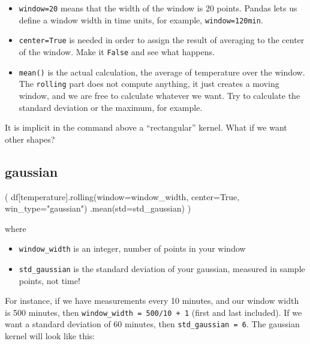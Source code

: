 \documentclass[
  letterpaper,
  DIV=11,
  numbers=noendperiod,
  oneside]{scrreprt}
\newenvironment{Shaded}{\begin{snugshade}}{\end{snugshade}}
\newcommand{\NormalTok}[1]{\textcolor[rgb]{0.00,0.23,0.31}{#1}}
\newcommand{\OperatorTok}[1]{\textcolor[rgb]{0.37,0.37,0.37}{#1}}
\newcommand{\StringTok}[1]{\textcolor[rgb]{0.13,0.47,0.30}{#1}}
\newcommand{\VariableTok}[1]{\textcolor[rgb]{0.07,0.07,0.07}{#1}}
\providecommand{\tightlist}{%
  \setlength{\itemsep}{0pt}\setlength{\parskip}{0pt}}\usepackage{longtable,booktabs,array}
\begin{document}
\begin{itemize}
\tightlist
\item
  \texttt{window=20} means that the width of the window is 20 points.
  Pandas lets us define a window width in time units, for example,
  \texttt{window=\textquotesingle{}120min\textquotesingle{}}.
\item
  \texttt{center=True} is needed in order to assign the result of
  averaging to the center of the window. Make it \texttt{False} and see
  what happens.
\item
  \texttt{mean()} is the actual calculation, the average of temperature
  over the window. The \texttt{rolling} part does not compute anything,
  it just creates a moving window, and we are free to calculate whatever
  we want. Try to calculate the standard deviation or the maximum, for
  example.
\end{itemize}

It is implicit in the command above a ``rectangular'' kernel. What if we
want other shapes?

\hypertarget{gaussian}{%
\subsection{gaussian}\label{gaussian}}

\begin{Shaded}
\begin{Highlighting}[]
\NormalTok{(}
\NormalTok{df[}\StringTok{\textquotesingle{}temperature\textquotesingle{}}\NormalTok{].rolling(window}\OperatorTok{=}\NormalTok{window\_width,}
\NormalTok{                          center}\OperatorTok{=}\VariableTok{True}\NormalTok{,}
\NormalTok{                          win\_type}\OperatorTok{=}\StringTok{"gaussian"}\NormalTok{)}
\NormalTok{                 .mean(std}\OperatorTok{=}\NormalTok{std\_gaussian)}
\NormalTok{)}
\end{Highlighting}
\end{Shaded}

where

\begin{itemize}
\tightlist
\item
  \texttt{window\_width} is an integer, number of points in your window
\item
  \texttt{std\_gaussian} is the standard deviation of your gaussian,
  measured in sample points, not time!
\end{itemize}

For instance, if we have measurements every 10 minutes, and our window
width is 500 minutes, then \texttt{window\_width\ =\ 500/10\ +\ 1}
(first and last included). If we want a standard deviation of 60
minutes, then \texttt{std\_gaussian\ =\ 6}. The gaussian kernel will
look like this:
\end{document}
